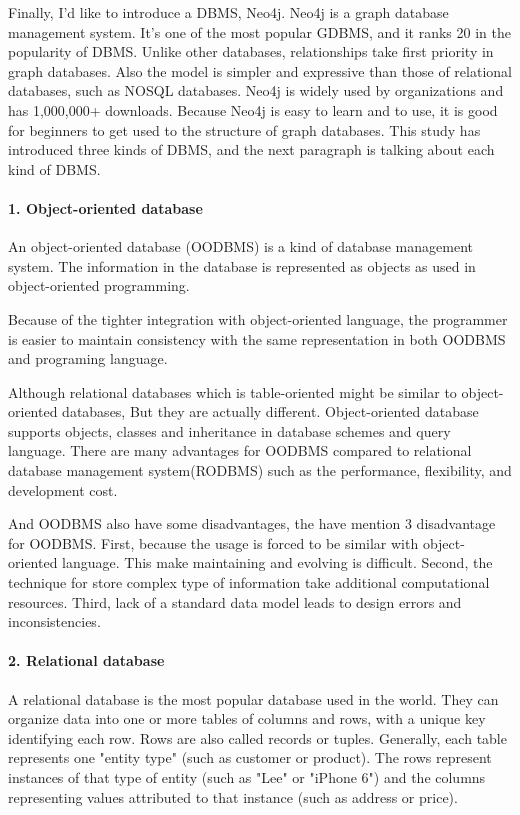 Finally, I’d like to introduce a DBMS, Neo4j. Neo4j is a graph database management system. It’s one of the most popular GDBMS, and it ranks 20 in the popularity of DBMS. Unlike other databases, relationships take first priority in graph databases. Also the model is simpler and expressive than those of relational databases, such as NOSQL databases. Neo4j is widely used by organizations and has 1,000,000+ downloads. Because Neo4j is easy to learn and to use, it is good for beginners to get used to the structure of graph databases. This study has introduced three kinds of DBMS, and the next paragraph is talking about each kind of DBMS.

\paragraph{1. Object-oriented database}
An object-oriented database (OODBMS) is a kind of database management 	system.\cite{WiKiauthor2013} The information in the database is represented as objects as used in object-oriented programming.

Because of the tighter integration with object-oriented language, the programmer is easier to maintain consistency with the same representation in both OODBMS and programing language.

Although relational databases which is table-oriented might be similar to object-oriented databases, But they are actually different. Object-oriented database supports objects, classes and inheritance in database schemes and query language.
There are many advantages for OODBMS compared to relational database management system(RODBMS) such as the performance, flexibility, and development cost.

And OODBMS also have some disadvantages, the \cite{Systems2010} have mention 3 disadvantage for OODBMS. First, because the usage is forced to be similar with object-oriented language. This make maintaining and evolving is  difficult. Second, the technique for store complex type of information take additional computational resources. Third, lack of a standard data model leads to design errors and inconsistencies.


\paragraph{2. Relational database}
A relational database is the most popular database used in the world. They can organize data into one or more tables of columns and rows, with a unique key identifying each row. Rows are also called records or tuples. Generally, each table represents one "entity type" (such as customer or product). The rows represent instances of that type of entity (such as "Lee" or "iPhone 6") and the columns representing values attributed to that instance (such as address or price).

